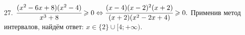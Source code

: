 27. $\cfrac{(x^2-6x+8)(x^2-4)}{x^3+8}\geqslant0\Leftrightarrow \cfrac{(x-4)(x-2)^2(x+2)}{(x+2)(x^2-2x+4)}\geqslant0.$ Применив метод интервалов, найдём ответ: $x\in\{2\}\cup[4;+\infty).$
\begin{figure}[ht!]
\end{figure}\\

